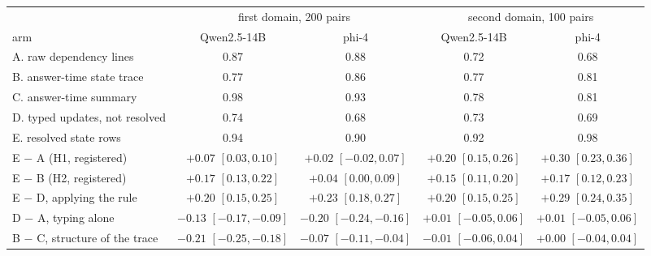 \begin{tabular}{@{}lcccc@{}}
\toprule
 & \multicolumn{2}{c}{first domain, 200 pairs} & \multicolumn{2}{c}{second domain, 100 pairs} \\
\cmidrule(lr){2-3}\cmidrule(l){4-5}
arm & Qwen2.5-14B & phi-4 & Qwen2.5-14B & phi-4 \\
\midrule
A. raw dependency lines & 0.87 & 0.88 & 0.72 & 0.68 \\
B. answer-time state trace & 0.77 & 0.86 & 0.77 & 0.81 \\
C. answer-time summary & 0.98 & 0.93 & 0.78 & 0.81 \\
D. typed updates, not resolved & 0.74 & 0.68 & 0.73 & 0.69 \\
E. resolved state rows & 0.94 & 0.90 & 0.92 & 0.98 \\
\midrule
E $-$ A (H1, registered) & $+0.07$ $[0.03,0.10]$ & $+0.02$ $[-0.02,0.07]$ & $+0.20$ $[0.15,0.26]$ & $+0.30$ $[0.23,0.36]$ \\
E $-$ B (H2, registered) & $+0.17$ $[0.13,0.22]$ & $+0.04$ $[0.00,0.09]$ & $+0.15$ $[0.11,0.20]$ & $+0.17$ $[0.12,0.23]$ \\
E $-$ D, applying the rule & $+0.20$ $[0.15,0.25]$ & $+0.23$ $[0.18,0.27]$ & $+0.20$ $[0.15,0.25]$ & $+0.29$ $[0.24,0.35]$ \\
D $-$ A, typing alone & $-0.13$ $[-0.17,-0.09]$ & $-0.20$ $[-0.24,-0.16]$ & $+0.01$ $[-0.05,0.06]$ & $+0.01$ $[-0.05,0.06]$ \\
B $-$ C, structure of the trace & $-0.21$ $[-0.25,-0.18]$ & $-0.07$ $[-0.11,-0.04]$ & $-0.01$ $[-0.06,0.04]$ & $+0.00$ $[-0.04,0.04]$ \\
\bottomrule
\end{tabular}
